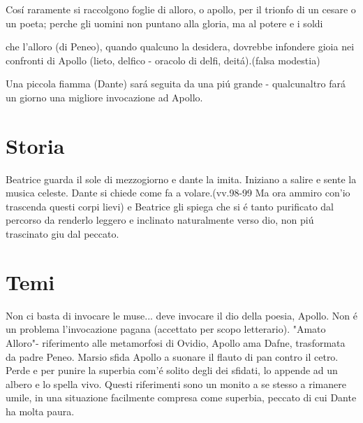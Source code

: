 \documentclass{article}
\begin{document}
Cosí raramente si raccolgono foglie di alloro, o apollo, per il trionfo di un cesare o un poeta; perche gli uomini non puntano alla gloria, ma al potere e i soldi

che l'alloro (di Peneo), quando qualcuno la desidera, dovrebbe infondere gioia nei confronti di Apollo (lieto, delfico - oracolo di delfi, deitá).(falsa modestia)

Una piccola fiamma (Dante) sará seguita da una piú grande - qualcunaltro fará un  giorno una migliore invocazione ad Apollo.

\section*{Storia}
Beatrice guarda il sole di mezzogiorno e dante la imita. Iniziano a salire e sente la musica celeste. Dante si chiede come fa a volare.(vv.98-99 Ma ora ammiro con'io trascenda questi corpi lievi) e Beatrice gli spiega che si é tanto purificato dal percorso da renderlo leggero e inclinato naturalmente verso dio, non piú trascinato giu dal peccato.
\section*{Temi}
Non ci basta di invocare le muse... deve invocare il dio della poesia, Apollo. Non é un problema l'invocazione pagana (accettato per scopo letterario). "Amato Alloro"- riferimento alle metamorfosi di Ovidio, Apollo ama Dafne, trasformata da padre Peneo.
Marsio sfida Apollo a suonare il flauto di pan contro il cetro. Perde e per punire la superbia com'é solito degli dei sfidati, lo appende ad un albero e lo spella vivo.
Questi riferimenti sono un monito a se stesso a rimanere umile, in una situazione facilmente compresa come superbia, peccato di cui Dante ha molta paura.
\end{document}
